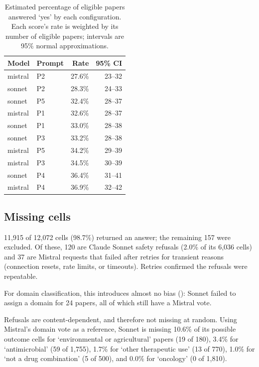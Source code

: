 \documentclass[openacc]{rstb}
\begin{document}
\begin{table}[h]
  \centering\small
  \caption{Estimated percentage of eligible papers answered `yes' by each configuration.
  Each score's rate is weighted by its number of eligible papers; intervals are 95\% normal approximations.}
  \label{tab:rates}
  \begin{tabular}{llrr}
    \hline
    Model & Prompt & Rate & 95\% CI \\
    \hline
    mistral & P2 & 27.6\% & 23--32 \\
    sonnet  & P2 & 28.3\% & 24--33 \\
    sonnet  & P5 & 32.4\% & 28--37 \\
    mistral & P1 & 32.6\% & 28--37 \\
    sonnet  & P1 & 33.0\% & 28--38 \\
    sonnet  & P3 & 33.2\% & 28--38 \\
    mistral & P5 & 34.2\% & 29--39 \\
    mistral & P3 & 34.5\% & 30--39 \\
    sonnet  & P4 & 36.4\% & 31--41 \\
    mistral & P4 & 36.9\% & 32--42 \\
    \hline
  \end{tabular}
\end{table}

\subsection{Missing cells}
11{,}915 of 12{,}072 cells (98.7\%) returned an answer; the remaining 157 were excluded.
Of these, 120 are Claude Sonnet safety refusals (2.0\% of its 6{,}036 cells) and 37 are Mistral requests that failed after retries for transient reasons (connection resets, rate limits, or timeouts).
Retries confirmed the refusals were repeatable.

For domain classification, this introduces almost no bias (): Sonnet failed to assign a domain for 24 papers, all of which still have a Mistral vote.

Refusals are content-dependent, and therefore not missing at random.
Using Mistral's domain vote as a reference, Sonnet is missing 10.6\% of its possible outcome cells for `environmental or agricultural' papers (19 of 180), 3.4\% for `antimicrobial' (59 of 1{,}755), 1.7\% for `other therapeutic use' (13 of 770), 1.0\% for `not a drug combination' (5 of 500), and 0.0\% for `oncology' (0 of 1{,}810).
\end{document}
